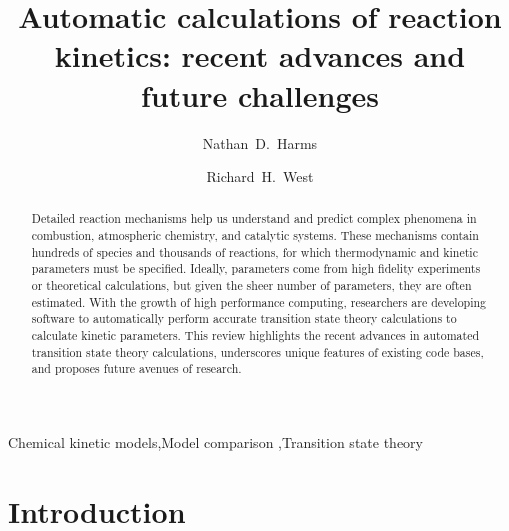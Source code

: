 \documentclass[preprint, 11pt]{elsarticle} %
\begin{document}
\begin{frontmatter}

\title{Automatic calculations of reaction kinetics: recent advances and future challenges}

\author[neu]{Nathan~D.~Harms}
\author[neu]{Richard~H.~West}%

\address[neu]{Department of Chemical Engineering\\
Northeastern University, Boston, MA 02115, USA}


\begin{abstract}

Detailed reaction mechanisms help us understand and predict complex phenomena in combustion, atmospheric chemistry, and catalytic systems.
These mechanisms contain hundreds of species and thousands of reactions, for which thermodynamic and kinetic parameters must be specified.
Ideally, parameters come from high fidelity experiments or theoretical calculations, but given the sheer number of parameters, they are often estimated.
With the growth of high performance computing, researchers are developing software to automatically perform accurate transition state theory calculations to calculate kinetic parameters. 
This review highlights the recent advances in automated transition state theory calculations, underscores unique features of existing code bases, and proposes future avenues of research.

\end{abstract}


\begin{keyword}
    Chemical kinetic models\sep Model comparison \sep Transition state theory
\end{keyword}

\end{frontmatter}


\section{Introduction}
% 

\end{document}
